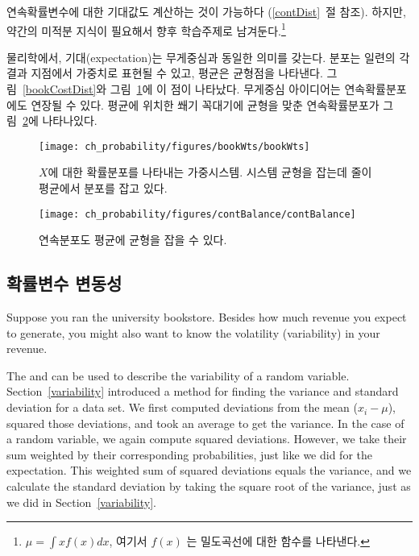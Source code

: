 연속확률변수에 대한 기대값도 계산하는 것이 가능하다 (\ref{contDist}~절 참조). 하지만, 약간의 미적분 지식이 필요해서 향후 학습주제로 남겨둔다.\footnote{$\mu = \int xf(x)dx$, 여기서 $f(x)$ 는 밀도곡선에 대한 함수를 나타낸다.}

물리학에서, 기대(expectation)는 무게중심과 동일한 의미를 갖는다. 분포는 일련의 각 결과 지점에서 가중치로 표현될 수 있고, 평균은 균형점을 나타낸다. 그림~\ref{bookCostDist}와 그림~\ref{bookWts}에 이 점이 나타났다. 무게중심 아이디어는 연속확률분포에도 연장될 수 있다. 평균에 위치한 쐐기 꼭대기에 균형을 맞춘 연속확률분포가 그림~\ref{contBalance}에 나타나있다.

\begin{figure}
\centering
\texttt{[image: ch\_probability/figures/bookWts/bookWts]}
\caption{$X$에 대한 확률분포를 나타내는 가중시스템. 시스템 균형을 잡는데 줄이 평균에서 분포를 잡고 있다.}
\label{bookWts}
\end{figure}

\begin{figure}
\centering
\texttt{[image: ch\_probability/figures/contBalance/contBalance]}
\caption{연속분포도 평균에 균형을 잡을 수 있다.}
\label{contBalance}
\end{figure}



\subsection{확률변수 변동성}

Suppose you ran the university bookstore. Besides how much revenue you expect to generate, you might also want to know the volatility (variability) in your revenue. 

The  and  can be used to describe the variability of a random variable. Section~\ref{variability}
introduced a method for finding the variance and standard deviation for a data set. We first computed deviations from the mean ($x_i - \mu$), squared those deviations, and took an average to get the variance. In the case of a random variable, we again compute squared deviations. However, we take their sum weighted by their corresponding probabilities, just like we did for the expectation. This weighted sum of squared deviations equals the variance, and we calculate the standard deviation by taking the square root of the variance, just as we did in Section~\ref{variability}.

